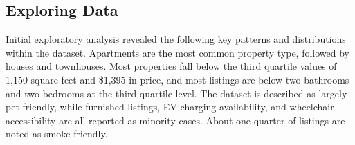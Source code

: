 \subsection{Exploring Data}
\noindent
Initial exploratory analysis revealed the following key patterns and distributions within the dataset. Apartments are the most common property type, followed by houses and townhouses. Most properties fall below the third quartile values of 1,150 square feet and \$1,395 in price, and most listings are below two bathrooms and two bedrooms at the third quartile level. The dataset is described as largely pet friendly, while furnished listings, EV charging availability, and wheelchair accessibility are all reported as minority cases. About one quarter of listings are noted as smoke friendly.




